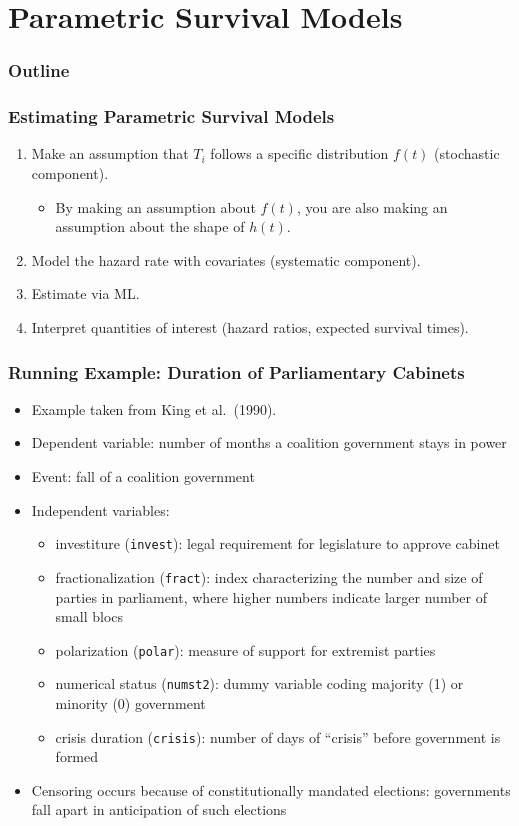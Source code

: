 \documentclass{beamer}
\begin{document}
\section{Parametric Survival Models}

\begin{frame}
\frametitle{Outline}
\tableofcontents[currentsection]
\end{frame}

\begin{frame}
\frametitle{Estimating Parametric Survival Models}
\pause
\begin{enumerate}
\item Make an assumption that $T_i$ follows a specific distribution
$f(t)$ (stochastic component).
\begin{itemize}
\pause
\item By making an assumption about $f(t)$, you are also making an
assumption about the shape of $h(t)$.
\end{itemize} 
\pause
\item Model the hazard rate with covariates (systematic component).
\pause
\item Estimate via ML.
\pause
\item Interpret quantities of interest (hazard ratios, expected
survival times).
\end{enumerate}
\end{frame}

\begin{frame}
\frametitle{Running Example: Duration of Parliamentary Cabinets}
\pause
\begin{itemize}
\item Example taken from King et al.\ (1990).
\pause
\item Dependent variable: number of months a coalition government
stays in power
\pause
\item Event: fall of a coalition government
\pause
\item Independent variables: 
\pause
\begin{itemize}
\item investiture ({\tt invest}): legal requirement for
legislature to approve cabinet
\pause
\item fractionalization ({\tt fract}): index characterizing the number
and size of parties in parliament, where higher numbers indicate
larger number of small blocs
\pause
\item polarization ({\tt polar}): measure of support for extremist parties
\pause
\item numerical status ({\tt numst2}): dummy variable coding majority
(1) or minority (0) government
\pause
\item crisis duration ({\tt crisis}): number of days of ``crisis''
before government is formed
\end{itemize}
\pause
\item Censoring occurs because of constitutionally mandated elections:
governments fall apart in anticipation of such elections
\end{itemize}
\end{frame}
\end{document}
